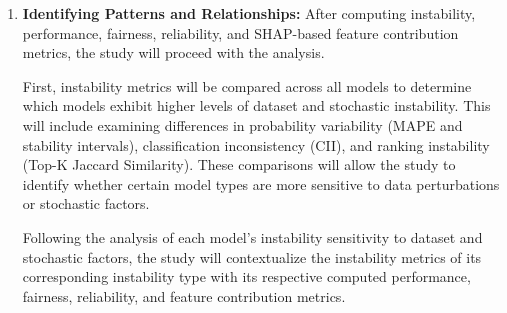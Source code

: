 \documentclass[12pt]{article}
\begin{document}
\begin{enumerate}
  SHAP values will be computed using model-specific explainers, where TreeExplainer will be applied to tree-based models such as Random Forest and XGBoost, and KernelExplainer will be used for Logistic Regression and LinearSVC. To ensure computational feasibility, a subset of the training data (e.g., 100 randomly sampled from the training data) will be used as the background dataset. The analysis will focus on both the magnitude and variability of SHAP values, where magnitude reflects the importance of a feature in influencing predictions, and variability across runs reflects the instability of that feature's contribution.

  To facilitate comparison, SHAP values will be aggregated across runs for each model, and summary statistics such as the mean and standard deviation will be computed for each feature. Visualizations, including SHAP summary plots and variability plots, will be used to illustrate the distribution and spread of SHAP values across runs. By integrating SHAP analysis with instability metrics, the study will identify features that consistently influence predictions as well as those whose contributions vary significantly, providing insight into how feature behavior contributes to model instability.

  \item \textbf{Identifying Patterns and Relationships:}
  After computing instability, performance, fairness, reliability, and SHAP-based feature contribution metrics,  the study will proceed with the analysis.
  
  First, instability metrics will be compared across all models to determine which models exhibit higher levels of dataset and stochastic instability. This will include examining differences in probability variability (MAPE and stability intervals), classification inconsistency (CII), and ranking instability (Top-K Jaccard Similarity). These comparisons will allow the study to identify whether certain model types are more sensitive to data perturbations or stochastic factors.


  Following the analysis of each model's instability sensitivity to dataset and stochastic factors, the study will contextualize the instability metrics of its corresponding instability type with its respective computed performance, fairness, reliability, and feature contribution metrics. 


\end{enumerate}
\end{document}
